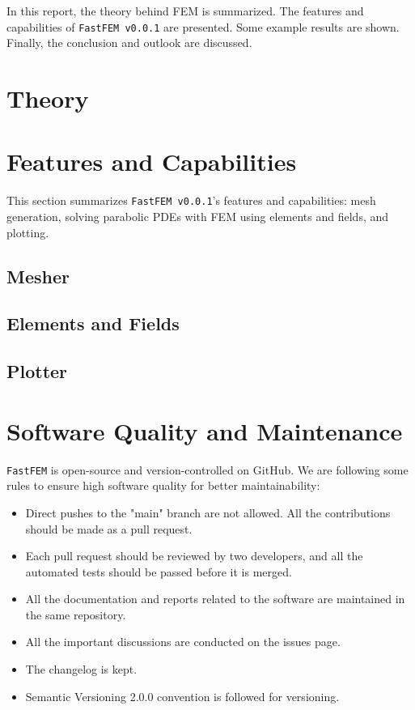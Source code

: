 \documentclass[headings=standardclasses, abstract=true]{scrartcl}
\begin{document}
In this report, the theory behind FEM is summarized. The features and capabilities of \texttt{FastFEM v0.0.1} are presented. Some example results are shown. Finally, the conclusion and outlook are discussed.

\section{Theory} \label{sec:theory}


\section{Features and Capabilities}

This section summarizes \texttt{FastFEM v0.0.1}'s features and capabilities: mesh generation, solving parabolic PDEs with FEM using elements and fields, and plotting.

\subsection{Mesher} \label{sec:mesher}


\subsection{Elements and Fields}\label{sec:elem_field}


\subsection{Plotter}


\section{Software Quality and Maintenance}

\texttt{FastFEM} is open-source and version-controlled on GitHub\supercite{fastfem}. We are following some rules to ensure high software quality for better maintainability:

\begin{itemize}
    \item Direct pushes to the "main" branch are not allowed. All the contributions should be made as a pull request.
    \item Each pull request should be reviewed by two developers, and all the automated tests should be passed before it is merged.
    \item All the documentation and reports related to the software are maintained in the same repository.
    \item All the important discussions are conducted on the issues page.
    \item The changelog is kept.
    \item Semantic Versioning 2.0.0\supercite{semanticVersioning} convention is followed for versioning.
\end{itemize}
\end{document}

